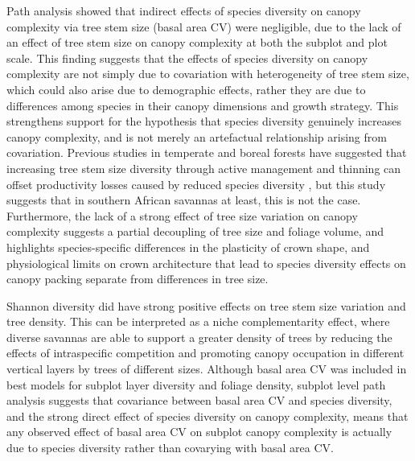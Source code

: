 \begin{refsection}
Path analysis showed that indirect effects of species diversity on canopy complexity via tree stem size (basal area CV) were negligible, due to the lack of an effect of tree stem size on canopy complexity at both the subplot and plot scale. This finding suggests that the effects of species diversity on canopy complexity are not simply due to covariation with heterogeneity of tree stem size, which could also arise due to demographic effects, rather they are due to differences among species in their canopy dimensions and growth strategy. This strengthens support for the hypothesis that species diversity genuinely increases canopy complexity, and is not merely an artefactual relationship arising from covariation. Previous studies in temperate and boreal forests have suggested that increasing tree stem size diversity through active management and thinning can offset productivity losses caused by reduced species diversity \citep{Levick2009}, but this study suggests that in southern African savannas at least, this is not the case. Furthermore, the lack of a strong effect of tree size variation on canopy complexity suggests a partial decoupling of tree size and foliage volume, and highlights species-specific differences in the plasticity of crown shape, and physiological limits on crown architecture that lead to species diversity effects on canopy packing separate from differences in tree size.

Shannon diversity did have strong positive effects on tree stem size variation and tree density. This can be interpreted as a niche complementarity effect, where diverse savannas are able to support a greater density of trees by reducing the effects of intraspecific competition and promoting canopy occupation in different vertical layers by trees of different sizes. Although basal area CV was included in best models for subplot layer diversity and foliage density, subplot level path analysis suggests that covariance between basal area CV and species diversity, and the strong direct effect of species diversity on canopy complexity, means that any observed effect of basal area CV on subplot canopy complexity is actually due to species diversity rather than covarying with basal area CV. 


\end{refsection}
